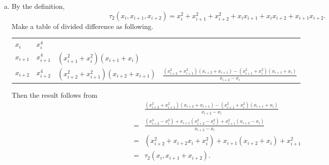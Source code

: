 \documentclass[11pt]{elegantbook}
\begin{document}
\begin{solution}
  \begin{enumerate}[(a)]
    \item By the definition,
    \begin{equation*}
      \tau_2(x_i,x_{i+1},x_{i+2})=x_i^2+x_{i+1}^2+x_{i+2}^2+x_ix_{i+1}+x_ix_{i+2}+x_{i+1}x_{i+2}.
    \end{equation*}
    Make a table of divided difference as following.
    \begin{table}[H]
      \centering
      \begin{tabular}{l|lll}
      $x_i$     & $x_i^4$     &                                          &                                                                                                 \\
      $x_{i+1}$ & $x_{i+1}^4$ & $(x_{i+1}^2+x_{i}^2)(x_{i+1}+x_{i})$     &                                                                                                 \\
      $x_{i+2}$ & $x_{i+2}^4$ & $(x_{i+2}^2+x_{i+1}^2)(x_{i+2}+x_{i+1})$ & $\frac{(x_{i+2}^2+x_{i+1}^2)(x_{i+2}+x_{i+1})-(x_{i+1}^2+x_{i}^2)(x_{i+1}+x_{i})}{x_{i+2}-x_i}$
      \end{tabular}
    \end{table}
    Then the result follows from 
    \begin{align*}
      &\frac{(x_{i+2}^2+x_{i+1}^2)(x_{i+2}+x_{i+1})-(x_{i+1}^2+x_{i}^2)(x_{i+1}+x_{i})}{x_{i+2}-x_i}\\
      =&\frac{(x_{i+2}^3-x_i^3)+x_{i+1}(x_{i+2}^2-x_i^2)+x_{i+1}^2(x_{i+2}-x_i)}{x_{i+2}-x_i}\\
      =&(x_{i+2}^2+x_{i+2}x_i+x_i^2)+x_{i+1}(x_{i+2}+x_i)+x_{i+1}^2\\
      =&\tau_2(x_i,x_{i+1}+x_{i+2}).
    \end{align*}


\end{enumerate}
\end{solution}
\end{document}
